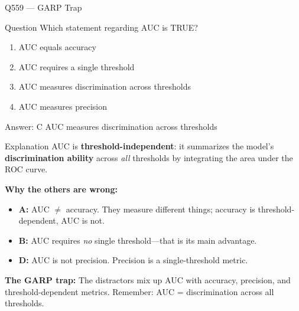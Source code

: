 \documentclass[aspectratio=169,8pt]{beamer}
\begin{document}
	\begin{frame}{Q559 --- GARP Trap}
		\begin{block}{Question}
			Which statement regarding AUC is TRUE?
			\begin{enumerate}
				\item AUC equals accuracy
				\item AUC requires a single threshold
				\item AUC measures discrimination across thresholds
				\item AUC measures precision
			\end{enumerate}
		\end{block}
		
		\begin{exampleblock}{Answer: C}
			AUC measures discrimination across thresholds
		\end{exampleblock}
		
		\begin{block}{Explanation}
			AUC is \textbf{threshold-independent}: it summarizes the model's
			\textbf{discrimination ability} across \emph{all} thresholds by integrating
			the area under the ROC curve.
			
			\textbf{Why the others are wrong:}
			\begin{itemize}
				\item \textbf{A:} AUC \(\neq\) accuracy. They measure different things;
				accuracy is threshold-dependent, AUC is not.
				\item \textbf{B:} AUC requires \emph{no} single threshold---that is its
				main advantage.
				\item \textbf{D:} AUC is not precision. Precision is a single-threshold
				metric.
			\end{itemize}
			
			\textbf{The GARP trap:} The distractors mix up AUC with accuracy, precision,
			and threshold-dependent metrics. Remember: AUC = discrimination across all
			thresholds.
			
			
		\end{block}
	\end{frame}
	
\end{document}
